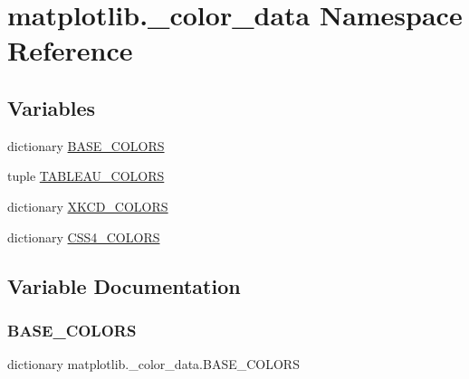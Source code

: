 \hypertarget{namespacematplotlib_1_1__color__data}{}\section{matplotlib.\+\_\+color\+\_\+data Namespace Reference}
\label{namespacematplotlib_1_1__color__data}
\subsection*{Variables}
\begin{DoxyCompactItemize}
\item 
dictionary \hyperlink{namespacematplotlib_1_1__color__data_acfff161b16b0773a523fb71c6d905c15}{B\+A\+S\+E\+\_\+\+C\+O\+L\+O\+RS}
\item 
tuple \hyperlink{namespacematplotlib_1_1__color__data_a3583533847f05d3a92ac5075703ebe0e}{T\+A\+B\+L\+E\+A\+U\+\_\+\+C\+O\+L\+O\+RS}
\item 
dictionary \hyperlink{namespacematplotlib_1_1__color__data_a1ba9e3f44a003d2a41600d968a368fd1}{X\+K\+C\+D\+\_\+\+C\+O\+L\+O\+RS}
\item 
dictionary \hyperlink{namespacematplotlib_1_1__color__data_a04a135a6563c6cbfe3bc529506662dca}{C\+S\+S4\+\_\+\+C\+O\+L\+O\+RS}
\end{DoxyCompactItemize}


\subsection{Variable Documentation}
\mbox{\label{namespacematplotlib_1_1__color__data_acfff161b16b0773a523fb71c6d905c15}} 
\subsubsection{\texorpdfstring{B\+A\+S\+E\+\_\+\+C\+O\+L\+O\+RS}{BASE\_COLORS}}
{\footnotesize\ttfamily dictionary matplotlib.\+\_\+color\+\_\+data.\+B\+A\+S\+E\+\_\+\+C\+O\+L\+O\+RS}

